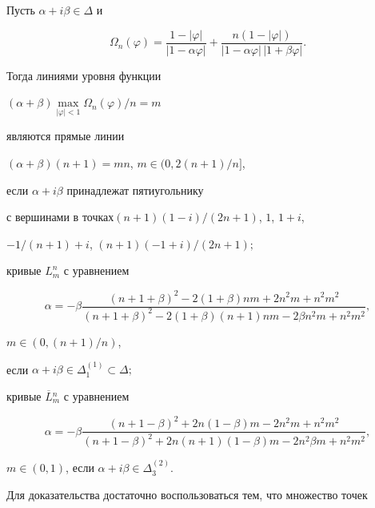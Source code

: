 \begin{lem}


Пусть $\alpha+i\beta\in\Delta$ и


$$


\Omega_n(\varphi)=


\frac{1-|\varphi|}{|1-\alpha\varphi|}+\frac{n(1-|\varphi|)}


{|1-\alpha\varphi|\,|1+\beta\varphi|}.


$$


Тогда линиями уровня функции


$(\alpha{+}\beta)\max\limits_{|\varphi|<1}\Omega_n(\varphi)/n{=}m$


являются прямые линии


$(\alpha{+}\beta)(n{+}1)=mn$, $m\in (0,2(n+1)/n]$,


если $\alpha+i\beta$ принадлежат пятиугольнику 


с вершинами в точках\linebreak $(n+1)(1-i)/(2n+1)$, $1$, $1+i$,


$-1/(n+1)+i$, $(n+1)(-1+i)/(2n+1);$





кривые $L_m^n$ с уравнением


$$


\alpha=-\beta\frac{(n+1+\beta)^2-2(1+\beta)nm+2n^2m+n^2


m^2}{(n+1+\beta)^2-2(1+\beta)(n+1)nm-2\beta n^2


m+n^2m^2},


$$


$m\in(0,(n+1)/n)$,


если $\alpha+i\beta\in\Delta_1^{(1)}\subset\Delta;$ 





кривые $\overline L{}_m^n$ с уравнением


$$


\alpha=-\beta\frac{(n+1-\beta)^2+2n(1-\beta)m-2n^2m+n^2m^2}


{(n+1-\beta)^2+2n(n+1)(1-\beta)m-2n^2\beta m+n^2m^2},


$$


$m\in(0,1)$, если $\alpha+i\beta\in\Delta_3^{(2)}$.


\end{lem}








Для доказательства достаточно воспользоваться тем, что множество точек


